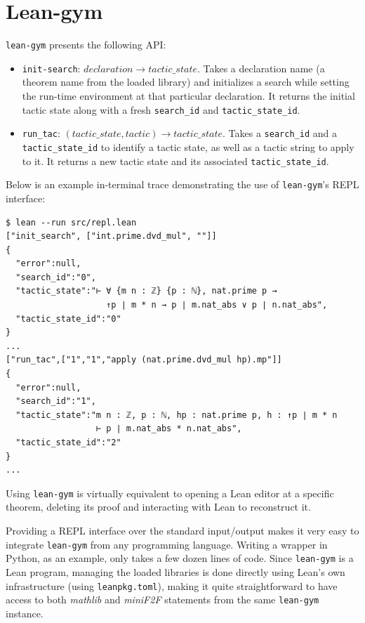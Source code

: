 \documentclass[nohyperref]{article}
\theoremstyle{plain}
\theoremstyle{definition}
\theoremstyle{remark}
\begin{document}
\section{Lean-gym}
\label{appendix-leangym}

\texttt{lean-gym} presents the following API:

\begin{itemize}

\item \verb|init-search|: $declaration \to tactic\_state$. Takes a declaration name (a theorem name from the loaded library) and initializes a search while setting the run-time environment at that particular declaration. It returns the initial tactic state along with a fresh \verb|search_id| and \verb|tactic_state_id|.
\item \verb|run_tac|: $(tactic\_state, tactic) \to tactic\_state$. Takes a \verb|search_id| and a \verb|tactic_state_id| to identify a tactic state, as well as a tactic string to apply to it. It returns a new tactic state and its associated \verb|tactic_state_id|.

\end{itemize}

Below is an example in-terminal trace demonstrating the use of \texttt{lean-gym}'s REPL interface:

\begin{verbatim}
$ lean --run src/repl.lean
["init_search", ["int.prime.dvd_mul", ""]]
{
  "error":null,
  "search_id":"0",
  "tactic_state":"⊢ ∀ {m n : ℤ} {p : ℕ}, nat.prime p → 
                    ↑p ∣ m * n → p ∣ m.nat_abs ∨ p ∣ n.nat_abs",
  "tactic_state_id":"0"
}
...
["run_tac",["1","1","apply (nat.prime.dvd_mul hp).mp"]]
{
  "error":null,
  "search_id":"1",
  "tactic_state":"m n : ℤ, p : ℕ, hp : nat.prime p, h : ↑p ∣ m * n
                  ⊢ p ∣ m.nat_abs * n.nat_abs",
  "tactic_state_id":"2"
}
...
\end{verbatim}

Using \texttt{lean-gym} is virtually equivalent to opening a Lean editor at a specific theorem, deleting its proof and interacting with Lean to reconstruct it.

Providing a REPL interface over the standard input/output makes it very easy to integrate \texttt{lean-gym} from any programming language. Writing a wrapper in Python, as an example, only takes a few dozen lines of code. Since \texttt{lean-gym} is a Lean program, managing the loaded libraries is done directly using Lean's own infrastructure (using \texttt{leanpkg.toml}), making it quite straightforward to have access to both \textit{mathlib} and \textit{miniF2F} statements from the same \texttt{lean-gym} instance.
\end{document}
